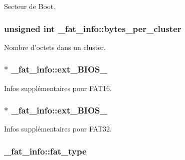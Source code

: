 Secteur de Boot. \hypertarget{struct__fat__info_ac1ba92d928512827ab7978f136efda96}{
\subsubsection[{bytes\+\_\+per\+\_\+cluster}]{\setlength{\rightskip}{0pt plus 5cm}unsigned int \+\_\+fat\+\_\+info\+::bytes\+\_\+per\+\_\+cluster}}\label{struct__fat__info_ac1ba92d928512827ab7978f136efda96}
Nombre d'octets dans un cluster. \hypertarget{struct__fat__info_a4da4c2a7a629ca59a686822e6447acb8}{
\subsubsection[{ext\+\_\+\+B\+I\+O\+S\+\_\+16}]{$\ast$ \+\_\+fat\+\_\+info\+::ext\+\_\+\+B\+I\+O\+S\+\_}}\label{struct__fat__info_a4da4c2a7a629ca59a686822e6447acb8}
Infos supplémentaires pour F\+A\+T16. \hypertarget{struct__fat__info_aab203e7eb3c2027e3034d7765a2d5281}{
\subsubsection[{ext\+\_\+\+B\+I\+O\+S\+\_\+32}]{$\ast$ \+\_\+fat\+\_\+info\+::ext\+\_\+\+B\+I\+O\+S\+\_}}\label{struct__fat__info_aab203e7eb3c2027e3034d7765a2d5281}
Infos supplémentaires pour F\+A\+T32. \hypertarget{struct__fat__info_af9e994d6d2c5211614ca61cfa4492500}{
\subsubsection[{fat\+\_\+type}]{ \+\_\+fat\+\_\+info\+::fat\+\_\+type}}\label{struct__fat__info_af9e994d6d2c5211614ca61cfa4492500}
